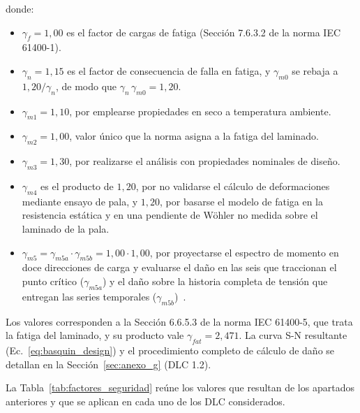 donde:
\begin{itemize}
    \item $\gamma_f = 1{,}00$ es el factor de cargas de fatiga (Sección 7.6.3.2 de la norma IEC 61400-1).
    \item $\gamma_n = 1{,}15$ es el factor de consecuencia de falla en fatiga, y $\gamma_{m0}$ se rebaja a $1{,}20 / \gamma_n$, de modo que $\gamma_n \, \gamma_{m0} = 1{,}20$.
    \item $\gamma_{m1} = 1{,}10$, por emplearse propiedades en seco a temperatura ambiente.
    \item $\gamma_{m2} = 1{,}00$, valor único que la norma asigna a la fatiga del laminado.
    \item $\gamma_{m3} = 1{,}30$, por realizarse el análisis con propiedades nominales de diseño.
    \item $\gamma_{m4}$ es el producto de $1{,}20$, por no validarse el cálculo de deformaciones mediante ensayo de pala, y $1{,}20$, por basarse el modelo de fatiga en la resistencia estática y en una pendiente de Wöhler no medida sobre el laminado de la pala.
    \item $\gamma_{m5} = \gamma_{m5a} \cdot \gamma_{m5b} = 1{,}00 \cdot 1{,}00$, por proyectarse el espectro de momento en doce direcciones de carga y evaluarse el daño en las seis que traccionan el punto crítico ($\gamma_{m5a}$) y el daño sobre la historia completa de tensión que entregan las series temporales ($\gamma_{m5b}$)~\parencite{IEC61400-5}.
\end{itemize}

Los valores corresponden a la Sección 6.6.5.3 de la norma IEC 61400-5, que trata la fatiga del laminado, y su producto vale $\gamma_{fat} = 2{,}471$. La curva S-N resultante (Ec.~\ref{eq:basquin_design}) y el procedimiento completo de cálculo de daño se detallan en la Sección~\ref{sec:anexo_g} (DLC 1.2).

La Tabla~\ref{tab:factores_seguridad} reúne los valores que resultan de los apartados anteriores y que se aplican en cada uno de los DLC considerados.

